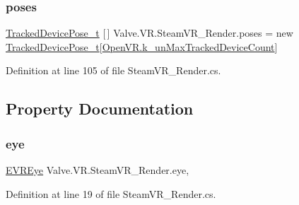 \mbox{\label{class_valve_1_1_v_r_1_1_steam_v_r___render_a38d4e5717b82b2be834d1876b2de0ac7}} 
\subsubsection{\texorpdfstring{poses}{poses}}
{\footnotesize\ttfamily \mbox{\hyperlink{struct_valve_1_1_v_r_1_1_tracked_device_pose__t}{Tracked\+Device\+Pose\+\_\+t}} \mbox{[}$\,$\mbox{]} Valve.\+V\+R.\+Steam\+V\+R\+\_\+\+Render.\+poses = new \mbox{\hyperlink{struct_valve_1_1_v_r_1_1_tracked_device_pose__t}{Tracked\+Device\+Pose\+\_\+t}}\mbox{[}\mbox{\hyperlink{class_valve_1_1_v_r_1_1_open_v_r_aec52ee031bff706f1b96c7f2c8ebc0ac}{Open\+V\+R.\+k\+\_\+un\+Max\+Tracked\+Device\+Count}}\mbox{]}}



Definition at line 105 of file Steam\+V\+R\+\_\+\+Render.\+cs.



\subsection{Property Documentation}
\mbox{\label{class_valve_1_1_v_r_1_1_steam_v_r___render_a2cddcf3b055e3c6323ebc41586f78d2c}} 
\subsubsection{\texorpdfstring{eye}{eye}}
{\footnotesize\ttfamily \mbox{\hyperlink{namespace_valve_1_1_v_r_a8153d4a3e627e1cede046327087c1880}{E\+V\+R\+Eye}} Valve.\+V\+R.\+Steam\+V\+R\+\_\+\+Render.\+eye\hspace{0.3cm}{\ttfamily [static]}, {\ttfamily [get]}}



Definition at line 19 of file Steam\+V\+R\+\_\+\+Render.\+cs.

\mbox{\label{class_valve_1_1_v_r_1_1_steam_v_r___render_afa00f388fb9bbd9a90773d319b079211}} 
